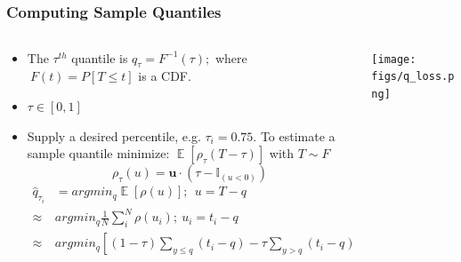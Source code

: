 \documentclass[t, pdftex]{beamer}
\DeclareMathOperator*{\E}{\mathbb{E}}
\begin{document}
\subsection{}
\begin{frame}[shrink=20]
\frametitle{Computing Sample Quantiles}
\begin{columns}
\begin{column}{0.5\textwidth}
\begin{itemize}
\item The $\tau^{th}$ quantile is $q_\tau = F^{-1}(\tau); $ where $\ F(t)=P[T \leq t]$ is a CDF.
\item $\tau \in [0, 1]$
\item Supply a desired percentile, e.g. $\tau_i = 0.75$.
To estimate a sample quantile minimize: $\E[\rho_\tau(T - \tau)]$ with $T \sim F$
\[
\rho_\tau( u) = \mathbf u \cdot (\tau - \mathbb{I}_{( u < 0)})
\]
\begin{equation}
\left.\begin{aligned}
\hat q_{\tau_i} &= argmin_{q} \E[\rho(u)];\ \  u = T - q  \\
\approx & argmin_q  \frac{1}{N} \sum_i^N \rho(u_i); \ u_i = t_i - q \\
\approx & argmin_q \left[ (1-\tau) \sum_{y \leq q}( t_i - q ) - \tau \sum_{y > q} (t_i - q) \right]
\end{aligned}\right. \nonumber
\end{equation}
\end{itemize}
\end{column}
\begin{column}{0.5\textwidth}  %
    \begin{center}
     \texttt{[image: figs/q\_loss.png]}
     \end{center}
\end{column}
\end{columns}
\end{frame}
\end{document}
